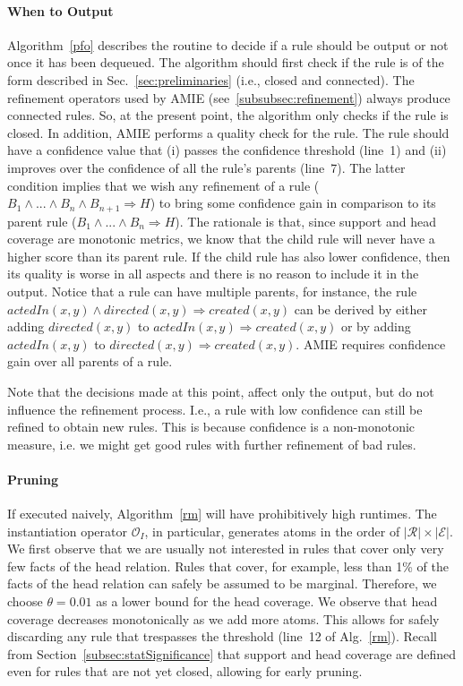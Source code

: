 \paragraph{When to Output}\label{subsubsec:whenToOutput}
Algorithm~\ref{pfo} describes the routine to decide if a rule should be output or not once it has been dequeued.
The algorithm should first check if the rule is of the form described in Sec.~\ref{sec:preliminaries} (i.e., closed and connected).
The refinement operators used by AMIE (see~\ref{subsubsec:refinement}) always produce connected rules. So, at the present point, the algorithm only checks if the rule is closed.
In addition, AMIE performs a quality check for the rule. The rule should have a confidence value that (i) passes the confidence threshold (line~1)
and (ii) improves over the confidence of all the rule's parents (line~7).
The latter condition implies that we wish any refinement of a rule ( $B_1 \wedge ... \wedge B_n \wedge B_{n+1} \Rightarrow H$) to bring some confidence gain in comparison to its parent rule
($B_1 \wedge ... \wedge B_n \Rightarrow H$). The rationale is that, since support and head coverage are monotonic metrics, we know that the child rule will never have a higher score than its parent rule. 
If the child rule has also lower confidence, then its quality is worse in all aspects and there is no reason to include it in the output.
Notice that a rule can have multiple parents, for instance, the rule $actedIn(x,y) \wedge directed(x,y) \Rightarrow created(x,y)$
can be derived by either adding $directed(x,y)$ to  $actedIn(x,y) \Rightarrow created(x,y)$ or by adding $actedIn(x,y)$ to
$directed(x,y) \Rightarrow created(x,y)$. AMIE requires confidence gain over all parents of a rule.

Note that the decisions made at this point, affect only the output, but do not influence the refinement process. I.e., a rule with low confidence can still be refined to obtain new rules.
This is because confidence is a non-monotonic measure, i.e. we might get good rules with further refinement of bad rules.




\paragraph{Pruning}
If executed naively, Algorithm~\ref{rm} will have prohibitively high runtimes.
The instantiation operator $\mathcal{O}_I$, in particular, generates atoms in the order of $|\mathcal{R}| \times |\mathcal{E}|$.
We first observe that we are usually not interested in rules that cover only very few facts of the head relation.
Rules that cover, for example, less than 1\% of the facts of the head relation can safely be assumed to be marginal.
Therefore, we choose $\theta=0.01$ as a lower bound for the head coverage. We observe that head coverage decreases monotonically as we add more atoms.
This allows for safely discarding any rule that trespasses the threshold (line~12 of Alg.~\ref{rm}).
Recall from Section~\ref{subsec:statSignificance} that support and head coverage are defined even for rules that are not yet closed, allowing for early pruning.


